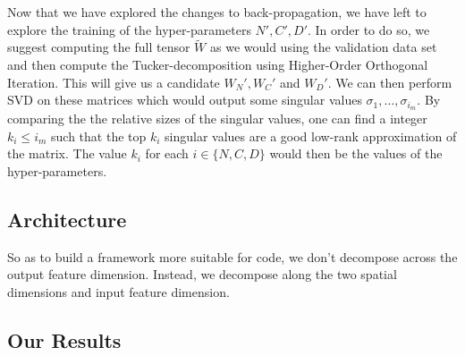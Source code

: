 \documentclass[a4paper]{article}
\begin{document}
\begin{multicols*}{2}
Now that we have explored the changes to back-propagation, we have left to explore the training of the hyper-parameters $N',C',D'$. In order to do so, we suggest computing the full tensor $\tilde{W}$ as we would using the validation data set and then compute the Tucker-decomposition using Higher-Order Orthogonal Iteration. This will give us a candidate $W_N', W_C'$ and $W_D'$. We can then perform \textsf{SVD} on these matrices which would output some singular values $\sigma_1, \dots, \sigma_{i_m}$. By comparing the the relative sizes of the singular values, one can find a integer $k_i \leq i_m$ such that the top $k_i$ singular values are a good low-rank approximation of the matrix. The value $k_i$ for each $i \in \{N, C, D\}$  would then be the values of the hyper-parameters.  

\subsection*{Architecture}


So as to build a framework more suitable for code, we don't decompose across the output feature dimension. Instead, we decompose along the two spatial dimensions and input feature dimension. 


\subsection*{Our Results}







\end{multicols*}
\end{document}
